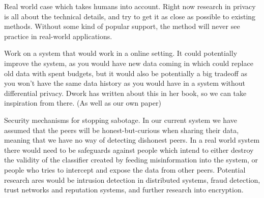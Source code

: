 Real world case which takes humans into account. Right now research in privacy is all about the technical details, and try to get it as close as possible to existing methods. Without some kind of popular support, the method will never see practice in real-world applications. 

Work on a system that would work in a online setting. It could potentially improve the system, as you would have new data coming in which could replace old data with spent budgets, but it would also be potentially a big tradeoff as you won't have the same data history as you would have in a system without differential privacy. Dwork has written about this in her book, so we can take inspiration from there. (As well as our own paper)

Security mechanisms for stopping sabotage. In our current system we have assumed that the peers will be honest-but-curious when sharing their data, meaning that we have no way of detecting dishonest peers. In a real world system there would need to be safeguards against people which intend to either destroy the validity of the classifier created by feeding misinformation into the system, or people who tries to intercept and expose the data from other peers. Potential research ares would be intrusion detection in distributed systems, fraud detection, trust networks and reputation systems, and further research into encryption.  



\newpage
\listoftodos[Notes]

\cleardoublepage